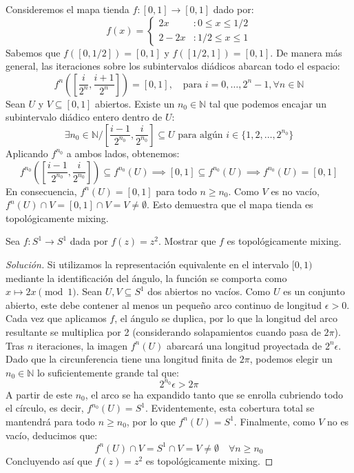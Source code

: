 \begin{ejemplo}
	Consideremos el mapa tienda $f: [0,1] \to [0,1]$ dado por:
	$$ f(x) = \begin{cases} 2x & : 0 \le x \le 1/2 \\ 2-2x & : 1/2 \le x \le 1 \end{cases} $$
	Sabemos que $f([0, 1/2]) = [0,1]$ y $f([1/2, 1]) = [0,1]$.
	De manera más general, las iteraciones sobre los subintervalos diádicos abarcan todo el espacio:
	$$ f^n\left(\left[\frac{i}{2^n}, \frac{i+1}{2^n}\right]\right) = [0,1], \quad \text{para } i=0, \dots, 2^n-1, \forall n \in \mathbb{N} $$
	Sean $U$ y $V \subseteq [0,1]$ abiertos. Existe un $n_0 \in \mathbb{N}$ tal que podemos encajar un subintervalo diádico entero dentro de $U$:
	$$ \exists n_0 \in \mathbb{N} / \left[\frac{i-1}{2^{n_0}}, \frac{i}{2^{n_0}}\right] \subseteq U \text{ para algún } i \in \{1, 2, \dots, 2^{n_0}\} $$
	Aplicando $f^{n_0}$ a ambos lados, obtenemos:
	$$ f^{n_0}\left(\left[\frac{i-1}{2^{n_0}}, \frac{i}{2^{n_0}}\right]\right) \subseteq f^{n_0}(U) \implies [0,1] \subseteq f^{n_0}(U) \implies f^{n_0}(U) = [0,1] $$
	En consecuencia, $f^n(U) = [0,1]$ para todo $n \ge n_0$. Como $V$ es no vacío, $f^n(U) \cap V = [0,1] \cap V = V \neq \emptyset$. Esto demuestra que el mapa tienda es topológicamente mixing.
\end{ejemplo}

\begin{ejercicio}
	Sea $f: S^1 \to S^1$ dada por $f(z) = z^2$. Mostrar que $f$ es topológicamente mixing.
\end{ejercicio}
\begin{proof}[Solución]
	Si utilizamos la representación equivalente en el intervalo $[0,1)$ mediante la identificación del ángulo, la función se comporta como $x \mapsto 2x \pmod 1$.
	Sean $U, V \subseteq S^1$ dos abiertos no vacíos. Como $U$ es un conjunto abierto, este debe contener al menos un pequeño arco continuo de longitud $\epsilon > 0$.
	Cada vez que aplicamos $f$, el ángulo se duplica, por lo que la longitud del arco resultante se multiplica por 2 (considerando solapamientos cuando pasa de $2\pi$). 
	Tras $n$ iteraciones, la imagen $f^n(U)$ abarcará una longitud proyectada de $2^n \epsilon$. 
	Dado que la circunferencia tiene una longitud finita de $2\pi$, podemos elegir un $n_0 \in \mathbb{N}$ lo suficientemente grande tal que:
	$$ 2^{n_0} \epsilon > 2\pi $$
	A partir de este $n_0$, el arco se ha expandido tanto que se enrolla cubriendo todo el círculo, es decir, $f^{n_0}(U) = S^1$. Evidentemente, esta cobertura total se mantendrá para todo $n \ge n_0$, por lo que $f^n(U) = S^1$.
	Finalmente, como $V$ no es vacío, deducimos que:
	$$ f^n(U) \cap V = S^1 \cap V = V \neq \emptyset \quad \forall n \ge n_0 $$
	Concluyendo así que $f(z) = z^2$ es topológicamente mixing.
\end{proof}

